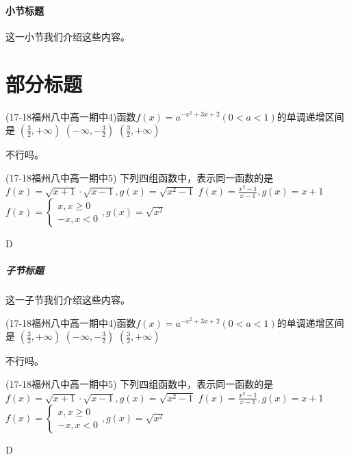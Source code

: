 \documentclass[12pt,UTF8]{ctexart}
\begin{document}
\subsection{小节标题}这一小节我们介绍这些内容。
\part{部分标题}
\begin{exercise}
\item (17-18福州八中高一期中4)函数$f(x)=a^{-x^2+3x+2}(0<a<1)$的单调递增区间是\xz
        {$(\frac32,+\infty)$}
        {$(-\infty,-\frac32)$}
        {$(\frac32,+\infty)$}
\begin{answer}
不行吗。
\end{answer}
\item  (17-18福州八中高一期中5) 下列四组函数中，表示同一函数的是\xz
        {$f(x)=\sqrt{x+1}\cdot\sqrt{x-1},g(x)=\sqrt{x^2-1}$}
        {$f(x)=\frac{x^2-1}{x-1},g(x)=x+1$}
        {$f(x)=\begin{cases}x,x\geq0\\-x,x<0\end{cases},g(x)=\sqrt{x^2}$}
\begin{answer}
D
\end{answer}
\end{exercise}
\subsubsection{子节标题}这一子节我们介绍这些内容。
\begin{exercise}
\item (17-18福州八中高一期中4)函数$f(x)=a^{-x^2+3x+2}(0<a<1)$的单调递增区间是\xz
        {$(\frac32,+\infty)$}
        {$(-\infty,-\frac32)$}
        {$(\frac32,+\infty)$}
\begin{answer}
不行吗。
\end{answer}
\item  (17-18福州八中高一期中5) 下列四组函数中，表示同一函数的是\xz
        {$f(x)=\sqrt{x+1}\cdot\sqrt{x-1},g(x)=\sqrt{x^2-1}$}
        {$f(x)=\frac{x^2-1}{x-1},g(x)=x+1$}
        {$f(x)=\begin{cases}x,x\geq0\\-x,x<0\end{cases},g(x)=\sqrt{x^2}$}
\begin{answer}
D
\end{answer}
\end{exercise}
\end{document}
